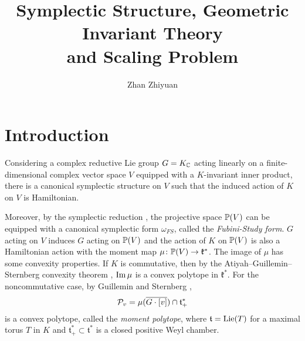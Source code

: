 \documentclass[a4paper,12pt]{article}
\title{Symplectic Structure, Geometric Invariant Theory \\and Scaling Problem}
\author{Zhan Zhiyuan}
\date{}
\newcommand{\sectionbreak}{\clearpage}
\begin{document}
	\maketitle
	\tableofcontents

\sectionbreak
	\section{Introduction}
	Considering a complex reductive Lie group $G = K_{\mathbb{C}}$ acting linearly on a finite-dimensional complex vector space $V$ equipped with a $K$-invariant inner product, there is a canonical symplectic structure on $V$ such that the induced action of $K$ on $V$ is Hamiltonian. 

	Moreover, by the symplectic reduction \cite{key3}, the projective space $\mathbb{P}(V)$ can be equipped with a canonical symplectic form $\omega_{FS}$, called the \emph{Fubini-Study form}. $G$ acting on $V$ induces $G$ acting on $\mathbb{P}(V)$ and the action of $K$ on $\mathbb{P}(V)$ is also a Hamiltonian action with the moment map $\mu \colon \mathbb{P}(V) \rightarrow \mathfrak{k}^*$. The image of $\mu$ has some convexity properties. If $K$ is commutative, then by the Atiyah–Guillemin–Sternberg convexity theorem \cite{key4,key5}, $\operatorname{Im}\mu$ is a convex polytope in $\mathfrak{k}^*$. For the noncommutative case, by Guillemin and Sternberg \cite{key6},
	\begin{equation*}
		\mathcal{P}_v = \mu(\overline{G\cdot [v]}) \cap \mathfrak{t}_{+}^*
	\end{equation*}
	is a convex polytope, called the \emph{moment polytope}, where $\mathfrak{t} = \operatorname{Lie}(T)$ for a maximal torus $T$ in $K$ and $\mathfrak{t}_{+}^* \subset \mathfrak{t}^*$ is a closed positive Weyl chamber.
\end{document}
